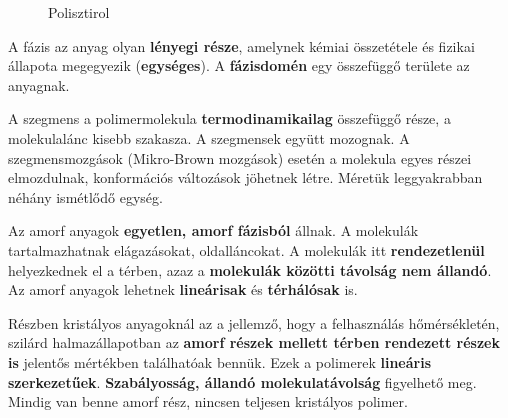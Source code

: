 \documentclass[12pt,a4paper]{article}       %
\begin{document}
\begin{tcbitemize}
  \begin{figure}[H]
    \centering
    \caption{Polisztirol}
  \end{figure}



  \tcbitem[title={\# \thetcbrasternum{} –
        Mi a fázis (anyagtudomány)?
      }]
  A fázis az anyag olyan \textbf{lényegi része}, amelynek kémiai összetétele és
  fizikai állapota megegyezik (\textbf{egységes}). A \textbf{fázisdomén} egy
  összefüggő területe az anyagnak.



  \tcbitem[title={\# \thetcbrasternum{} –
        Mit jelent polimerek esetében a szegmens?
      }]
  A szegmens a polimermolekula \textbf{termodinamikailag} összefüggő része, a
  molekulalánc kisebb szakasza. A szegmensek együtt mozognak. A
  szegmensmozgások (Mikro-Brown mozgások) esetén a molekula egyes részei
  elmozdulnak, konformációs változások jöhetnek létre. Méretük leggyakrabban
  néhány ismétlődő egység.



  \tcbitem[title={\# \thetcbrasternum{} –
        Mit jelent az, hogy egy polimer amorf?
      }]
  Az amorf  anyagok \textbf{egyetlen, amorf fázisból} állnak. A molekulák
  tartalmazhatnak elágazásokat, oldalláncokat. A molekulák itt
  \textbf{rendezetlenül} helyezkednek el a térben, azaz a \textbf{molekulák
    közötti távolság nem állandó}. Az amorf anyagok lehetnek
  \textbf{lineárisak} és \textbf{térhálósak} is.



  \tcbitem[title={\# \thetcbrasternum{} –
        Mit jelent az, hogy egy polimer részben kristályos?
      }]
  Részben kristályos anyagoknál az a jellemző, hogy a felhasználás
  hőmérsékletén, szilárd halmazállapotban az \textbf{amorf részek mellett
    térben rendezett részek is} jelentős mértékben találhatóak bennük. Ezek a
  polimerek \textbf{lineáris szerkezetűek}. \textbf{Szabályosság, állandó
    molekulatávolság} figyelhető meg. Mindig van benne amorf rész, nincsen
  teljesen kristályos polimer.




\end{tcbitemize}
\end{document}
